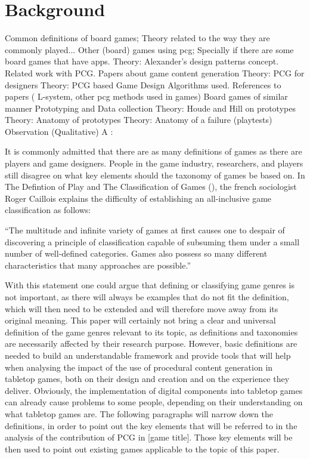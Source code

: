 \section{Background}
Common definitions of board games; Theory related to the way they are commonly played...
Other (board) games using pcg; Specially if there are some board games that have apps. 
Theory: Alexander's design patterns concept.
Related work with PCG.
Papers about game content generation
Theory: PCG for designers
Theory: PCG based Game Design
Algorithms used.
References to papers ( L-system, other pcg methods used in games)
Board games of similar manner
Prototyping and Data collection 
Theory: Houde and Hill on prototypes
Theory: Anatomy of prototypes
Theory: Anatomy of a failure (playtests)
Observation (Qualitative)
A :

It is commonly admitted that there are as many definitions of games as there are players and game designers. People in the game industry, researchers, and players still disagree on what key elements should the taxonomy of games be based on. In The Defintion of Play and The Classification of Games (), the french sociologist Roger Caillois explains the difficulty of establishing an all-inclusive game classification as follows:

“The multitude and infinite variety of games at first causes one to despair of discovering a principle of classification capable of subsuming them under a small number of well-defined categories. Games also possess so many different characteristics that many approaches are possible.”

With this statement one could argue that defining or classifying game genres is not important, as there will always be examples that do not fit the definition, which will then need to be extended and will therefore move away from its original meaning. This paper will certainly not bring a clear and universal definition of the game genres relevant to its topic, as definitions and taxonomies are necessarily affected by their research purpose. However, basic definitions are needed to build an understandable framework and provide tools that will help when analysing the impact of the use of procedural content generation in tabletop games, both on their design and creation and on the experience they deliver.
Obviously, the implementation of digital components into tabletop games can already cause problems to some people, depending on their understanding on what tabletop games are. The following paragraphs will narrow down the definitions, in order to point out the key elements that will be referred to in the analysis of the contribution of PCG in [game title]. Those key elements will be then used to point out existing games applicable to the topic of this paper.


